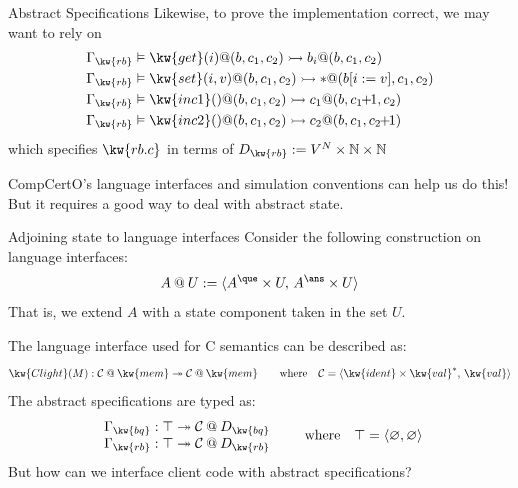 \documentclass[aspectratio=1610,12pt]{beamer}
\begin{document}
\begin{frame}{Abstract Specifications} %
Likewise,
to prove the implementation correct,
we may want to rely on
\begin{align*}
  \Gamma_\kw{rb} &\vDash
    \kw{get}(i)@(b, c_1, c_2) \rightarrowtail
    b_i@(b, c_1, c_2) \\
  \Gamma_\kw{rb} &\vDash
    \kw{set}(i, v)@(b, c_1, c_2) \rightarrowtail
    *@(b[i := v], c_1, c_2) \\
  \Gamma_\kw{rb} &\vDash
    \kw{inc1}()@(b, c_1, c_2) \rightarrowtail
    c_1@(b, c_1\!\!+\!\!1, c_2) \\
  \Gamma_\kw{rb} &\vDash
    \kw{inc2}()@(b, c_1, c_2) \rightarrowtail
    c_2@(b, c_1, c_2\!\!+\!\!1)
\end{align*}
which specifies $\kw{rb.c}$ in terms of
$D_\kw{rb} := V^N \times \mathbb{N} \times \mathbb{N}$

\vfill\pause

CompCertO's language interfaces and simulation conventions can help us do this! \\
But it requires a good way to deal with abstract state.
\end{frame}

\begin{frame}{Adjoining state to language interfaces} %
Consider the following construction on language interfaces:
\[
  A \mathbin@ U := \langle A^\que \times U, \, A^\ans \times U \rangle
\]
That is, we extend $A$ with a state component taken in the set $U$.

\vfill \pause
The language interface used for C semantics can be described as:
\[
  \kw{Clight}(M) : \mathcal{C} \mathbin@ \kw{mem} \twoheadrightarrow
      \mathcal{C} \mathbin@ \kw{mem}
  \qquad \text{where} \quad
  \mathcal{C} = \langle \kw{ident} \times \kw{val}^*, \, \kw{val} \rangle
\]
\pause
The abstract specifications are typed as:
\[
  \begin{array}{c}
    \Gamma_\kw{bq} : \top \twoheadrightarrow \mathcal{C} \mathbin@ D_\kw{bq} \\
    \Gamma_\kw{rb} : \top \twoheadrightarrow \mathcal{C} \mathbin@ D_\kw{rb}
  \end{array}
  \qquad \text{where} \quad
  \top = \langle \varnothing, \varnothing \rangle
\]
But how can we interface client code with abstract specifications?
\end{frame}
\end{document}
